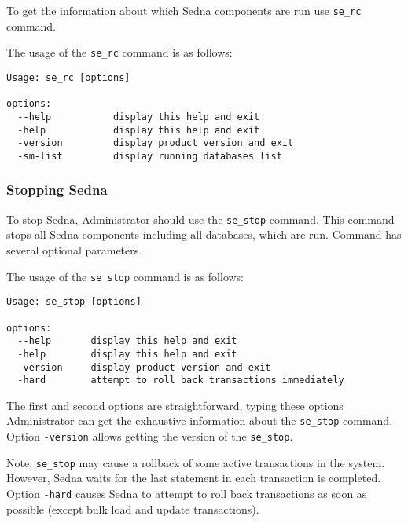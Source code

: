 \documentclass[a4paper,12pt]{article}
\begin{document}
To get the information about which Sedna components are run use \verb!se_rc!
command.

The usage of the \verb!se_rc! command is as follows:

\small{
\begin{verbatim}
Usage: se_rc [options]

options:
  --help           display this help and exit
  -help            display this help and exit
  -version         display product version and exit
  -sm-list         display running databases list
\end{verbatim}}


\subsubsection{Stopping Sedna}

To stop Sedna, Administrator should use the \verb!se_stop! command. This command
stops all Sedna components including all databases, which are run. Command has
several optional parameters.

The usage of the \verb!se_stop! command is as follows:

\small{
\begin{verbatim}
Usage: se_stop [options]

options:
  --help       display this help and exit
  -help        display this help and exit
  -version     display product version and exit
  -hard        attempt to roll back transactions immediately
\end{verbatim}}

The first and second options are straightforward, typing these options
Administrator can get the exhaustive information about the \verb!se_stop!
command. Option \verb!-version! allows getting the version of the
\verb!se_stop!.

Note, \verb!se_stop! may cause a rollback of some active transactions in the
system. However, Sedna waits for the last statement in each transaction is
completed. Option \verb!-hard! causes Sedna to attempt to roll back transactions
as soon as possible (except bulk load and update transactions).


\end{document}
